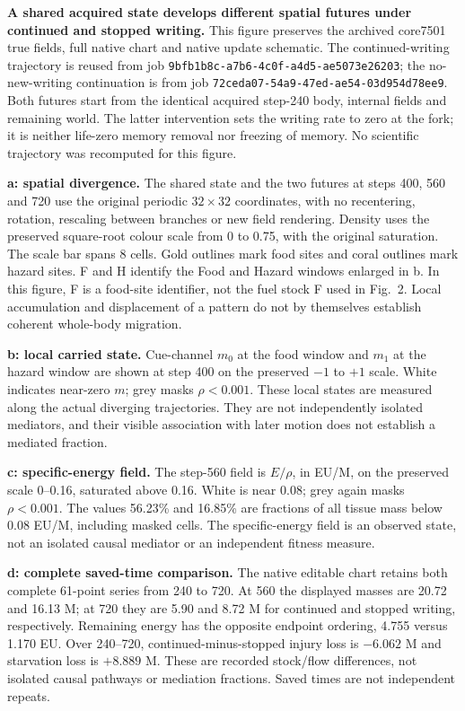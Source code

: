 \textbf{A shared acquired state develops different spatial futures under continued and stopped writing.}
This figure preserves the archived core7501 true fields, full native chart and native update schematic. The continued-writing trajectory is reused from job \texttt{9bfb1b8c-a7b6-4c0f-a4d5-ae5073e26203}; the no-new-writing continuation is from job \texttt{72ceda07-54a9-47ed-ae54-03d954d78ee9}. Both futures start from the identical acquired step-240 body, internal fields and remaining world. The latter intervention sets the writing rate to zero at the fork; it is neither life-zero memory removal nor freezing of memory. No scientific trajectory was recomputed for this figure.

\textbf{a: spatial divergence.} The shared state and the two futures at steps 400, 560 and 720 use the original periodic $32\times32$ coordinates, with no recentering, rotation, rescaling between branches or new field rendering. Density uses the preserved square-root colour scale from 0 to 0.75, with the original saturation. The scale bar spans 8 cells. Gold outlines mark food sites and coral outlines mark hazard sites. F and H identify the Food and Hazard windows enlarged in b. In this figure, F is a food-site identifier, not the fuel stock F used in Fig.~2. Local accumulation and displacement of a pattern do not by themselves establish coherent whole-body migration.

\textbf{b: local carried state.} Cue-channel $m_0$ at the food window and $m_1$ at the hazard window are shown at step 400 on the preserved $-1$ to $+1$ scale. White indicates near-zero $m$; grey masks $\rho<0.001$. These local states are measured along the actual diverging trajectories. They are not independently isolated mediators, and their visible association with later motion does not establish a mediated fraction.

\textbf{c: specific-energy field.} The step-560 field is $E/\rho$, in EU/M, on the preserved scale 0--0.16, saturated above 0.16. White is near 0.08; grey again masks $\rho<0.001$. The values 56.23\% and 16.85\% are fractions of all tissue mass below 0.08 EU/M, including masked cells. The specific-energy field is an observed state, not an isolated causal mediator or an independent fitness measure.

\textbf{d: complete saved-time comparison.} The native editable chart retains both complete 61-point series from 240 to 720. At 560 the displayed masses are 20.72 and 16.13 M; at 720 they are 5.90 and 8.72 M for continued and stopped writing, respectively. Remaining energy has the opposite endpoint ordering, 4.755 versus 1.170 EU. Over 240--720, continued-minus-stopped injury loss is $-6.062$ M and starvation loss is $+8.889$ M. These are recorded stock/flow differences, not isolated causal pathways or mediation fractions. Saved times are not independent repeats.


